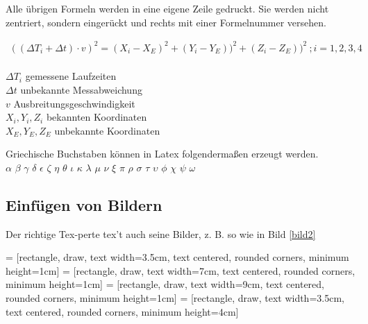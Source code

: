 Alle übrigen Formeln werden in eine eigene Zeile gedruckt. Sie werden nicht zentriert, sondern eingerückt und rechts mit einer Formelnummer versehen.

\begin{align}
((\Delta T_i +\Delta t) \cdot v)^2  = (X_i -X_E)^2+(Y_i -Y_E))^2+(Z_i -Z_E))^2 \  ; i=1,2,3,4 
\end{align}\\

\hspace*{12mm}$\Delta T_i$ \hspace{2,2cm} gemessene Laufzeiten \\
\hspace*{12mm}$\Delta t$ \hspace{2,4cm} unbekannte Messabweichung\\
\hspace*{12mm}$v$ \hspace{2,6cm} Ausbreitungsgeschwindigkeit\\
\hspace*{12mm}$X_i,Y_i,Z_i$ \hspace{1,3cm} bekannten Koordinaten\\
\hspace*{12mm}$X_E,Y_E,Z_E$ \hspace{1cm} unbekannte Koordinaten\\

\vspace{1.0cm}


Griechische Buchstaben können in Latex folgendermaßen erzeugt werden. \\

$\alpha$ $\beta$ $\gamma$ $\delta$ $\epsilon$ $\zeta$ $\eta$ $\theta$ $\iota$ $\kappa$ $\lambda$ $\mu$ $\nu$ $\xi$ $\pi$ $\rho$ $\sigma$ $\tau$ $\upsilon$ $\phi$ $\chi$ $\psi$ $\omega$ \\

\newpage


\subsection{Einfügen von Bildern}

Der richtige Tex-perte tex't auch seine Bilder, z. B. so wie in Bild \ref{bild2}

	 = [rectangle, draw, 
    text width=3.5cm, text centered, rounded corners, minimum height=1cm]
	 = [rectangle, draw, 
    text width=7cm, text centered, rounded corners, minimum height=1cm]
	 = [rectangle, draw, 
    text width=9cm, text centered, rounded corners, minimum height=1cm]
	 = [rectangle, draw, 
    text width=3.5cm, text centered, rounded corners, minimum height=4cm]
	 
